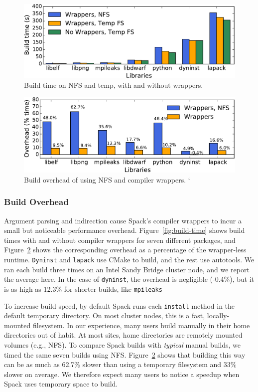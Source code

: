 \begin{figure}%
	\centering
	\includegraphics[width=\columnwidth]{figs/overhead/build-time.pdf}
	\caption{
		Build time on NFS and temp, with and without wrappers.
		\label{fig:build-times}
	}
\end{figure}
\begin{figure}%
	\centering
	\includegraphics[width=\columnwidth]{figs/overhead/overhead.pdf}
	\caption{
		Build overhead of using NFS and compiler wrappers.
		\label{fig:overhead}`
	}
\end{figure}

\subsubsection{Build Overhead}

Argument parsing and indirection cause Spack's compiler wrappers to incur a small
but noticeable performance overhead.  Figure~\ref{fig:build-time} shows
build times with and without compiler wrappers for seven different packages,
and Figure~\ref{fig:overhead} shows the corresponding overhead as a percentage
of the wrapper-less runtime.  {\tt Dyninst} and {\tt lapack}
use CMake to build, and the rest use autotools.  We ran
each build three times on an Intel Sandy Bridge cluster node, and we
report the average here.
In the case of {\tt dyninst}, the overhead is negligible (-0.4\%),
but it is as high as 12.3\% for shorter builds, like
{\tt mpileaks}

To increase build speed, by default Spack runs each {\tt install}
method in the default temporary directory. On most cluster nodes,
this is a fast, locally-mounted filesystem. In our experience,
many users build manually in their home directories out of habit.  At most sites, home
directories are remotely mounted volumes (e.g., NFS).  To compare Spack builds
with {\it typical} manual builds, we timed the same seven builds using
NFS.  Figure~\ref{fig:overhead} shows that building this way can be as much
as 62.7\% slower than using a temporary filesystem and
33\% slower on average. We therefore expect many users to notice
a speedup when Spack uses temporary space to build.


